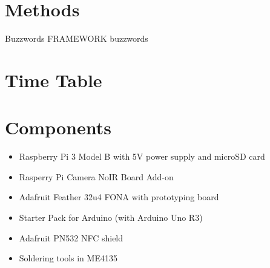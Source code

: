 \documentclass{article}
\begin{document}
\lipsum[1]

\section{Methods}

Buzzwords FRAMEWORK buzzwords

\lipsum[1]

\section{Time Table}

\lipsum[1]

\section{Components}

\begin{itemize}
\item Raspberry Pi 3 Model B with 5V power supply and microSD card
\item Rasperry Pi Camera NoIR Board Add-on
\item Adafruit Feather 32u4 FONA with prototyping board
\item Starter Pack for Arduino (with Arduino Uno R3)
\item Adafruit PN532 NFC shield
\item Soldering tools in ME4135
\end{itemize}

\pagebreak

\printbibliography
\end{document}
